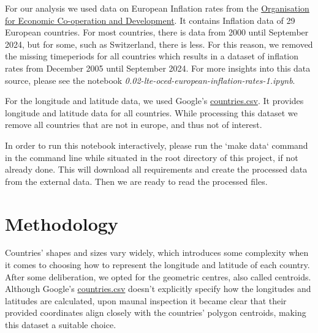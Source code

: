\documentclass{article}
\begin{document}
    For our analysis we used data on European Inflation rates from the \href{https://data-explorer.oecd.org/vis?tm=inflation&pg=0&snb=50&vw=tb&df%5Bds%5D=dsDisseminateFinalDMZ&df%5Bid%5D=DSD_PRICES%40DF_PRICES_HICP&df%5Bag%5D=OECD.SDD.TPS&df%5Bvs%5D=1.0&dq=HRV%2BBGR%2BTUR%2BGBR%2BCHE%2BSVN%2BSWE%2BESP%2BSVK%2BPRT%2BPOL%2BNOR%2BNLD%2BLUX%2BLTU%2BLVA%2BIRL%2BITA%2BISL%2BHUN%2BGRC%2BDEU%2BFRA%2BFIN%2BEST%2BDNK%2BBEL%2BCZE%2BAUT.M.HICP.CPI.PA._T.N.GY&to%5BTIME_PERIOD%5D=false&pd=2000-01%2C2024-10}{Organisation for Economic Co-operation and Development}. It contains Inflation data of 29 European countries. For most countries, there is data from 2000 until September 2024, but for some, such as Switzerland, there is less. For this reason, we removed the missing timeperiods for all countries which results in a dataset of inflation rates from December 2005 until September 2024. For more insights into this data source, please see the notebook \emph{0.02-lte-oced-european-inflation-rates-1.ipynb}. 

    For the longitude and latitude data, we used Google's \href{https://developers.google.com/public-data/docs/canonical/countries_csv}{countries.csv}. It provides longitude and latitude data for all countries. While processing this dataset we remove all countries that are not in europe, and thus not of interest.

    In order to run this notebook interactively, please run the `make data` command in the command line while situated in the root directory of this project, if not already done. This will download all requirements and create the processed data from the external data. Then we are ready to read the processed files.

    \section{Methodology}

    Countries' shapes and sizes vary widely, which introduces some complexity when it comes to choosing how to represent the longitude and latitude of each country. After some deliberation, we opted for the geometric centres, also called centroids. Although Google's \href{https://developers.google.com/public-data/docs/canonical/countries_csv}{countries.csv} doesn't explicitly specify how the longitudes and latitudes are calculated, upon maunal inspection it became clear that their provided coordinates align closely with the countries' polygon centroids, making this dataset a suitable choice.
    
\end{document}
